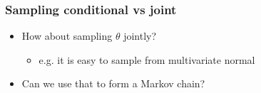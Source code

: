 \documentclass[10pt]{beamer}
\begin{document}
\begin{frame}

\frametitle{Sampling conditional vs joint}

  \begin{itemize}
  \item How about sampling $\theta$ jointly?
    \begin{itemize}
    \item e.g. it is easy to sample from multivariate normal
    \end{itemize}
    \item<2-> Can we use that to form a Markov chain?
  \end{itemize}

\end{frame}
\end{document}
